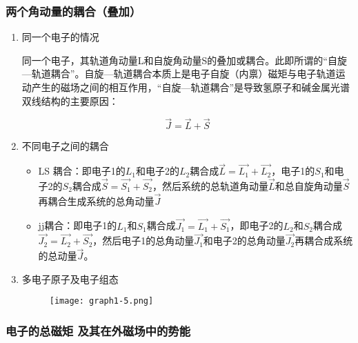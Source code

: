 \documentclass[dvipsnames, svgnames,a4paper,11pt]{article}
\begin{document}
	\subsubsection{两个角动量的耦合（叠加）}

		\begin{enumerate}
			\item 同一个电子的情况

				同一个电子，其轨道角动量L和自旋角动量S的叠加或耦合。此即所谓的“自旋—轨道耦合”。自旋—轨道耦合本质上是电子自旋（内禀）磁矩与电子轨道运动产生的磁场之间的相互作用，“自旋—轨道耦合”是导致氢原子和碱金属光谱双线结构的主要原因：

					\[
						\vec{J}=\vec{L}+\vec{S}	
					\]

			\item 不同电子之间的耦合

				\begin{itemize}
					\item LS 耦合：即电子1的$L_1$和电子2的$L_2$耦合成$\vec{L}=\vec{L_1}+\vec{L_2}$，电子1的$S_1$和电子2的$S_2$耦合成$\vec{S}=\vec{S_1}+\vec{S_2}$，然后系统的总轨道角动量$\vec{L}$和总自旋角动量$\vec{S}$再耦合生成系统的总角动量$\vec{J}$
					
					\item jj耦合：即电子1的$L_1$和$S_1$耦合成$\vec{J_1}=\vec{L_1}+\vec{S_1}$，即电子2的$L_2$和$S_2$耦合成$\vec{J_2}=\vec{L_2}+\vec{S_2}$，然后电子1的总角动量$\vec{J_1}$和电子2的总角动量$\vec{J_2}$再耦合成系统的总动量$\vec{J}$。
				\end{itemize}

			\item 多电子原子及电子组态
			
				\begin{figure}[H]
					\centering
					\texttt{[image: graph1-5.png]}
					\label{fig:graph1-5}
				\end{figure}
				
				
		\end{enumerate}



	\subsubsection{电子的总磁矩 及其在外磁场中的势能}
\end{document}
